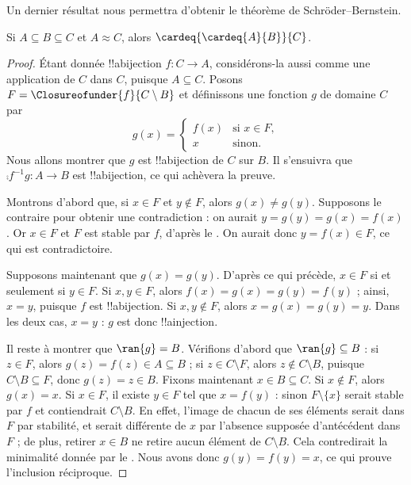 \documentclass[../../../include/open-logic-section]{subfiles}
\begin{document}
Un dernier résultat nous permettra d'obtenir le théorème de
Schröder--Bernstein.

\begin{prop}
Si $A \subseteq B \subseteq C$ et $A \approx C$, alors
$\cardeq{\cardeq{A}{B}}{C}$.
\end{prop}

\begin{proof}
Étant donnée !!a{bijection} $f\colon C\to A$, considérons-la aussi
comme une application de $C$ dans $C$, puisque $A\subseteq C$.
Posons $F=\Closureofunder{f}{C\setminus B}$ et définissons une
fonction $g$ de domaine $C$ par
\[
	g(x) =
	\begin{cases}
			f(x) &\text{si $x \in F$},\\
			x &\text{sinon}.
		\end{cases}
\]
Nous allons montrer que $g$ est !!a{bijection} de $C$ sur $B$.
Il s'ensuivra que $\comp{f^{-1}}{g}\colon A\to B$ est
!!a{bijection}, ce qui achèvera la preuve.

Montrons d'abord que, si $x\in F$ et $y\notin F$, alors
$g(x)\neq g(y)$. Supposons le contraire pour obtenir une contradiction :
on aurait $y=g(y)=g(x)=f(x)$. Or $x\in F$ et $F$ est stable par $f$,
d'après le . On aurait donc $y=f(x)\in F$,
ce qui est contradictoire.

Supposons maintenant que $g(x)=g(y)$. D'après ce qui précède,
$x\in F$ si et seulement si $y\in F$. Si $x,y\in F$, alors
$f(x)=g(x)=g(y)=f(y)$ ; ainsi, $x=y$, puisque $f$ est !!a{bijection}.
Si $x,y\notin F$, alors $x=g(x)=g(y)=y$. Dans les deux cas, $x=y$ :
$g$ est donc !!a{injection}.

Il reste à montrer que $\ran{g}=B$. Vérifions d'abord que
$\ran{g}\subseteq B$ : si $z\in F$, alors $g(z)=f(z)\in A\subseteq B$ ;
si $z\in C\setminus F$, alors $z\notin C\setminus B$, puisque
$C\setminus B\subseteq F$, donc $g(z)=z\in B$.
%
%
Fixons maintenant $x\in B\subseteq C$. Si $x\notin F$, alors $g(x)=x$.
Si $x\in F$, il existe $y\in F$ tel que $x=f(y)$ : sinon
$F\setminus\{x\}$ serait stable par $f$ et contiendrait $C\setminus B$.
En effet, l'image de chacun de ses éléments serait dans $F$ par stabilité,
et serait différente de $x$ par l'absence supposée d'antécédent dans $F$ ;
de plus, retirer $x\in B$ ne retire aucun élément de $C\setminus B$.
Cela contredirait la minimalité donnée par le .
Nous avons donc $g(y)=f(y)=x$, ce qui prouve l'inclusion réciproque.
\end{proof}
\end{document}
